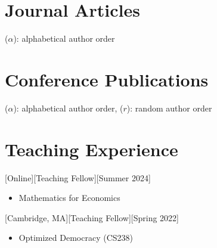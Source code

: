 \documentclass{article}
\begin{document}
	\section{Journal Articles}
	
	\renewcommand{\labelenumi}{J\theenumi.}
	{\footnotesize($\alpha$): alphabetical author order}
	
%        
%    
%	
	
    \begin{etaremune}
    [itemsep=0.2ex,
    	leftmargin=4.8ex]
        
    \end{etaremune}
    
    
    
	

    \section{Conference Publications}
    {\footnotesize($\alpha$): alphabetical author order, ($r$): random author order}
    
    \begin{etaremune}
    	[itemsep=0.2ex,
    	leftmargin=4.8ex]
    	\renewcommand{\labelenumi}{C\theenumi.}
        
    \end{etaremune}
    
%        
%    
     
    

    
    \section{Teaching Experience}
    [Online][Teaching Fellow][Summer 2024]
    \begin{itemize}
    	\item Mathematics for Economics
    \end{itemize}
    [Cambridge, MA][Teaching Fellow][Spring 2022]
    \begin{itemize}
        \item Optimized Democracy (CS238)
    \end{itemize}
    
\end{document}

